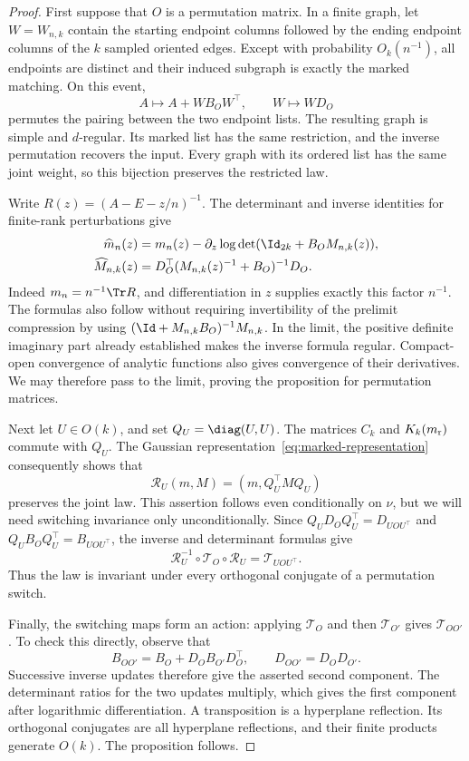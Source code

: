 \begin{proof}
First suppose that \(O\) is a permutation matrix. In a finite graph, let
\(W=W_{n,k}\) contain the starting endpoint columns followed by the ending
endpoint columns of the \(k\) sampled oriented edges. Except with probability
\(O_k(n^{-1})\), all endpoints are distinct and their induced subgraph is
exactly the marked matching. On this event,
\[
 A\longmapsto A+WB_OW^\top,\qquad W\longmapsto WD_O
\]
permutes the pairing between the two endpoint lists. The resulting graph is
simple and \(d\)-regular. Its marked list has the same restriction, and the
inverse permutation recovers the input. Every graph with its ordered list
has the same joint weight, so this bijection preserves the restricted law.

Write \(R(z)=(A-E-z/n)^{-1}\). The determinant and inverse identities for
finite-rank perturbations give
\begin{align*}
 \widehat m_n(z)
 &=m_n(z)-\partial_z\log\det(\Id_{2k}+B_OM_{n,k}(z)),\\
 \widehat M_{n,k}(z)
 &=D_O^\top(M_{n,k}(z)^{-1}+B_O)^{-1}D_O.
\end{align*}
Indeed \(m_n=n^{-1}\Tr R\), and differentiation in \(z\) supplies exactly
this factor \(n^{-1}\). The formulas also follow without requiring
invertibility of the prelimit compression by using
\((\Id+M_{n,k}B_O)^{-1}M_{n,k}\). In the limit, the positive definite
imaginary part already established makes the inverse formula regular.
Compact-open convergence of analytic functions also gives convergence of
their derivatives. We may therefore pass to the limit, proving the
proposition for permutation matrices.

Next let \(U\in O(k)\), and set \(Q_U=\diag(U,U)\).
The matrices \(C_k\) and \(K_k(m_{\rm r})\) commute with \(Q_U\).
The Gaussian representation~\eqref{eq:marked-representation} consequently
shows that
\[
 \mathcal R_U(m,M)=(m,Q_U^\top M Q_U)
\]
preserves the joint law. This assertion follows even conditionally on
\(\nu\), but we will need switching invariance only unconditionally.
Since \(Q_UD_OQ_U^\top=D_{UOU^\top}\) and
\(Q_UB_OQ_U^\top=B_{UOU^\top}\), the inverse and determinant formulas give
\[
 \mathcal R_U^{-1}\circ\mathcal T_O\circ\mathcal R_U
       =\mathcal T_{UOU^\top}.
\]
Thus the law is invariant under every orthogonal conjugate of a
permutation switch.

Finally, the switching maps form an action:
applying \(\mathcal T_O\) and then \(\mathcal T_{O'}\) gives
\(\mathcal T_{OO'}\). To check this directly, observe that
\begin{equation}\label{eq:sw-composition}
 B_{OO'}=B_O+D_OB_{O'}D_O^\top,\qquad D_{OO'}=D_OD_{O'}.
\end{equation}
Successive inverse updates therefore give the asserted second component.
The determinant ratios for the two updates multiply, which gives the first
component after logarithmic differentiation. A transposition is a
hyperplane reflection. Its orthogonal conjugates are all hyperplane
reflections, and their finite products generate \(O(k)\). The proposition
follows.
\end{proof}


